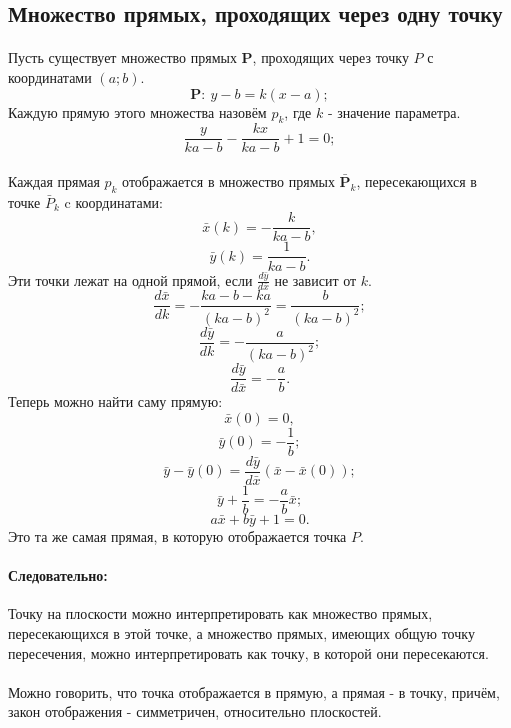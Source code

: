 \subsection{Множество прямых, проходящих через одну точку}
\paragraph{}Пусть существует множество прямых $\mathbf{P}$, проходящих через точку $P$ с координатами $(a; b)$.
$$\mathbf{P}:\: y-b = k(x - a);$$
Каждую прямую этого множества назовём $p_k$, где $k$ - значение параметра.
$$\frac{y}{ka-b} - \frac{kx}{ka-b} + 1 = 0;$$
\paragraph{}Каждая прямая $p_k$ отображается в множество прямых $\mathbf{\bar{P}}_k$, пересекающихся в точке $\bar{P}_k$ c координатами:
$$\bar{x}(k) = -\frac{k}{ka-b},$$
$$\bar{y}(k) = \frac{1}{ka-b}.$$
Эти точки лежат на одной прямой, если $\frac{d\bar{y}}{d\bar{x}}$ не зависит от $k$.
$$\frac{d\bar{x}}{dk} = - \frac{ka-b-ka}{\left(ka-b\right)^2} =  \frac{b}{\left(ka-b\right)^2};$$
$$\frac{d\bar{y}}{dk} = - \frac{a}{\left(ka-b\right)^2};$$
$$\frac{d\bar{y}}{d\bar{x}} = -\frac{a}{b}.$$
Теперь можно найти саму прямую:
$$\bar{x}(0) = 0,$$
$$\bar{y}(0) = -\frac{1}{b};$$
$$\bar{y} - \bar{y}(0) = \frac{d\bar{y}}{d\bar{x}}\left(\bar{x} - \bar{x}(0)\right);$$
$$\bar{y} + \frac{1}{b} = -\frac{a}{b}\bar{x};$$
$$a\bar{x} + b\bar{y} + 1 = 0.$$
Это та же самая прямая, в которую отображается точка $P$.
\paragraph{Следовательно:} Точку на плоскости можно интерпретировать как множество прямых, пересекающихся в этой точке, а множество прямых, имеющих общую точку пересечения, можно интерпретировать как точку, в которой они пересекаются.
\paragraph{} Можно говорить, что точка отображается в прямую, а прямая - в точку, причём, закон отображения - симметричен, относительно плоскостей.
